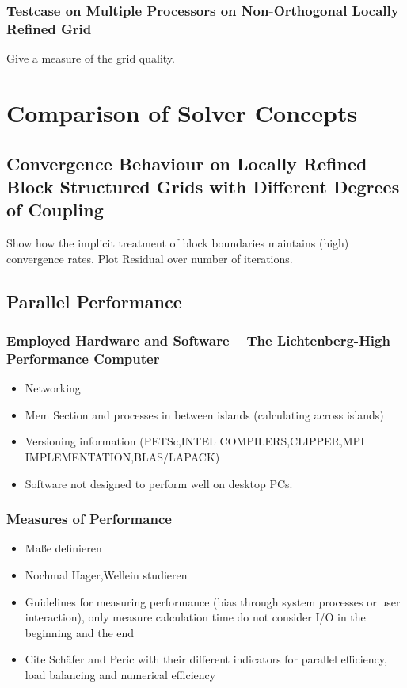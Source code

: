 \documentclass[article,type=msc,colorback,accentcolor=tud2a]{tudthesis}
\begin{document}
      \subsubsection{Testcase on Multiple Processors on Non-Orthogonal Locally Refined Grid}

        Give a measure of the grid quality.

  \section{Comparison of Solver Concepts}
  
    \subsection{Convergence Behaviour on Locally Refined Block Structured Grids with Different Degrees of Coupling}

      Show how the implicit treatment of block boundaries maintains (high) convergence rates. Plot Residual over number of iterations.

    \subsection{Parallel Performance}
      \subsubsection{Employed Hardware and Software -- The Lichtenberg-High Performance Computer }
        \begin{itemize}
          \item Networking
          \item Mem Section and processes in between islands (calculating across islands)
          \item Versioning information (PETSc,INTEL COMPILERS,CLIPPER,MPI IMPLEMENTATION,BLAS/LAPACK)
          \item Software not designed to perform well on desktop PCs.
        \end{itemize}

      \subsubsection{Measures of Performance}
        \begin{itemize}
          \item Maße definieren
          \item Nochmal Hager,Wellein studieren
          \item Guidelines for measuring performance (bias through system processes or user interaction), only measure calculation time do not consider I/O in the beginning and the end
          \item Cite Schäfer and Peric with their different indicators for parallel efficiency, load balancing and numerical efficiency
        \end{itemize}
\end{document}
